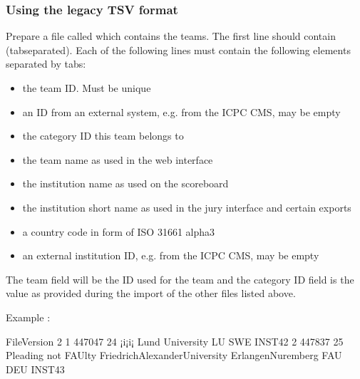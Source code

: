 \documentclass[a4paper,10pt,english,openany]{sphinxmanual}
\begin{document}
\subsubsection{Using the legacy TSV format}
\label{\detokenize{import:id2}}
\sphinxAtStartPar
Prepare a file called  which contains the teams.
The first line should contain  (tab\sphinxhyphen{}separated).
Each of the following lines must contain the following elements separated by tabs:
\begin{itemize}
\item {} 
\sphinxAtStartPar
the team ID. Must be unique

\item {} 
\sphinxAtStartPar
an ID from an external system, e.g. from the ICPC CMS, may be empty

\item {} 
\sphinxAtStartPar
the category ID this team belongs to

\item {} 
\sphinxAtStartPar
the team name as used in the web interface

\item {} 
\sphinxAtStartPar
the institution name as used on the scoreboard

\item {} 
\sphinxAtStartPar
the institution short name as used in the jury interface and certain exports

\item {} 
\sphinxAtStartPar
a country code in form of ISO 3166\sphinxhyphen{}1 alpha\sphinxhyphen{}3

\item {} 
\sphinxAtStartPar
an external institution ID, e.g. from the ICPC CMS, may be empty

\end{itemize}

\sphinxAtStartPar
The team  field will be the ID used for the team and the category ID field is the value
as provided during the import of the other files listed above.

\sphinxAtStartPar
Example :

\begin{sphinxVerbatim}[commandchars=\\\{\}]
File\PYGZus{}Version   2
1    447047  24      ¡i¡i¡   Lund University LU      SWE     INST\PYGZhy{}42
2    447837  25      Pleading not FAUlty     Friedrich\PYGZhy{}Alexander\PYGZhy{}University Erlangen\PYGZhy{}Nuremberg       FAU     DEU     INST\PYGZhy{}43
\end{sphinxVerbatim}
\end{document}
